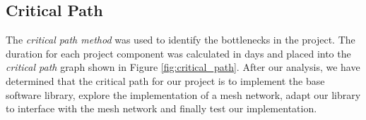 \subsection{Critical Path}
The \emph{critical path method} was used to identify the bottlenecks in the project. The duration for each project component was calculated in days and placed into the \emph{critical path} graph shown in Figure \ref{fig:critical_path}. After our analysis, we have determined that the critical path for our project is to implement the base software library, explore the implementation of a mesh network, adapt our library to interface with the mesh network and finally test our implementation.

\begin{figure}[H]
    \centering
    
\end{figure}

